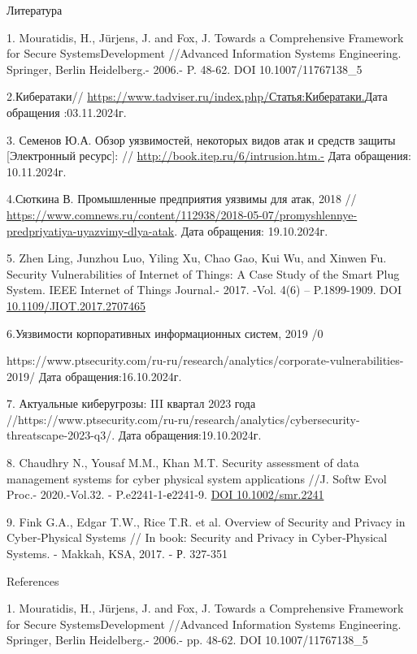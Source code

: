 Литература

1. Mouratidis, H., Jürjens, J. and Fox, J. Towards a Comprehensive
Framework for Secure SystemsDevelopment //Advanced Information Systems
Engineering. Springer, Berlin Heidelberg.- 2006.- P. 48-62. DOI
10.1007/11767138\_5

2.Кибератаки//
\href{\%20https://www.tadviser.ru/index.php/Статья:Кибератаки.}{https://www.tadviser.ru/index.php/Статья:Кибератаки.}Дата
обращения :03.11.2024г.

3. Семенов Ю.А. Обзор уязвимостей, некоторых видов атак и средств защиты
{[}Электронный ресурс{]}: // \url{http://book.itep.ru/6/intrusion.htm.-}
Дата обращения: 10.11.2024г.

4.Сюткина В. Промышленные предприятия уязвимы для атак, 2018 //
\url{https://www.comnews.ru/content/112938/2018-05-07/promyshlennye-predpriyatiya-uyazvimy-dlya-atak}.
Дата обращения: 19.10.2024г.

5. Zhen Ling, Junzhou Luo, Yiling Xu, Chao Gao, Kui Wu, and Xinwen Fu.
Security Vulnerabilities of Internet of Things: A Case Study of the
Smart Plug System. IEEE Internet of Things Journal.- 2017. -Vol. 4(6) --
P.1899-1909. DOI
\href{https://doi.org/10.1109/JIOT.2017.2707465}{10.1109/JIOT.2017.2707465}

6.Уязвимости корпоративных информационных систем, 2019 /0

https://www.ptsecurity.com/ru-ru/research/analytics/corporate-vulnerabilities-2019/
Дата обращения:16.10.2024г.

7. Актуальные киберугрозы: III квартал 2023 года
//https://www.ptsecurity.com/ru-ru/research/analytics/cybersecurity-threatscape-2023-q3/.
Дата обращения:19.10.2024г.

8. Chaudhry N., Yousaf M.M., Khan M.T. Security assessment of data
management systems for cyber physical system applications //J. Softw
Evol Proc.- 2020.-Vol.32. - P.e2241-1-е2241-9.
\href{https://doi.org/10.1002/smr.2241}{DOI 10.1002/smr.2241}

9. Fink G.A., Edgar T.W., Rice T.R. et al. Overview of Security and
Privacy in Cyber‐Physical Systems // In book: Security and Privacy in
Cyber‐Physical Systems. - Makkah, KSA, 2017. - Р. 327-351

References

1. Mouratidis, H., Jürjens, J. and Fox, J. Towards a Comprehensive
Framework for Secure SystemsDevelopment //Advanced Information Systems
Engineering. Springer, Berlin Heidelberg.- 2006.- pp. 48-62. DOI
10.1007/11767138\_5

